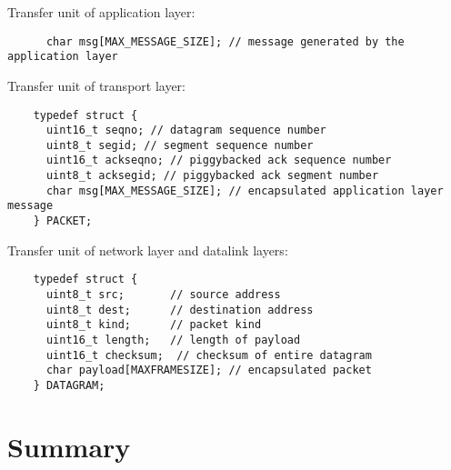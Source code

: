 \documentclass[11pt,a4paper,oneside]{report}
\begin{document}
Transfer unit of application layer:
    \begin{lstlisting}
      char msg[MAX_MESSAGE_SIZE]; // message generated by the application layer
    \end{lstlisting}
  
Transfer unit of transport layer:
       
    \begin{lstlisting}
    typedef struct {
      uint16_t seqno; // datagram sequence number
      uint8_t segid; // segment sequence number
      uint16_t ackseqno; // piggybacked ack sequence number
      uint8_t acksegid; // piggybacked ack segment number
      char msg[MAX_MESSAGE_SIZE]; // encapsulated application layer message
    } PACKET;
    \end{lstlisting}
  
Transfer unit of network layer and datalink layers:   
    
    \begin{lstlisting}
    typedef struct {
      uint8_t src;       // source address
      uint8_t dest;      // destination address
      uint8_t kind;      // packet kind
      uint16_t length;   // length of payload
      uint16_t checksum;  // checksum of entire datagram
      char payload[MAXFRAMESIZE]; // encapsulated packet
    } DATAGRAM;
   \end{lstlisting}
   

\section*{Summary}
\end{document}
